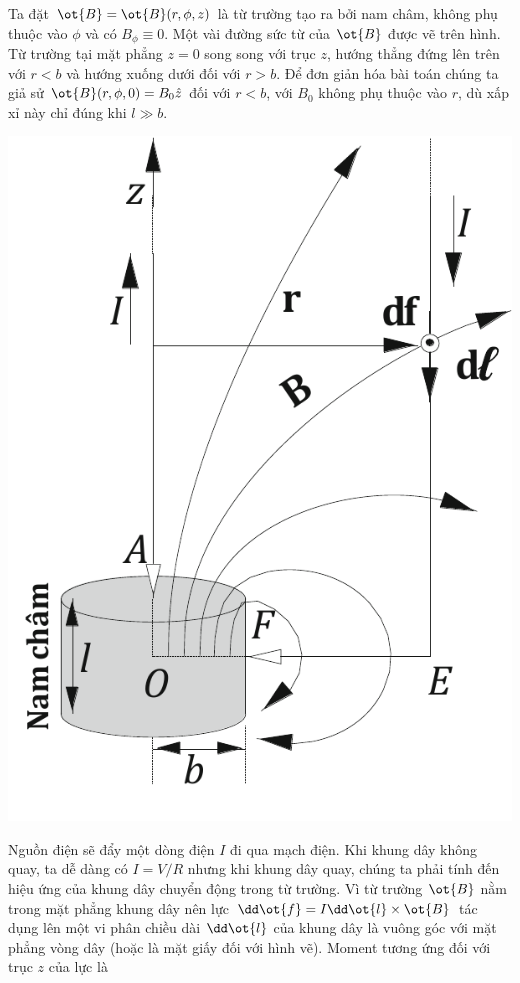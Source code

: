 \begin{loigiai}
\begin{center}
 \end{center}
Ta đặt $\ot{B} = \ot{B} (r, \phi, z)$ là từ trường tạo ra bởi nam châm, không phụ thuộc vào $\phi$ và có $B_{\phi} \equiv 0$. Một vài đường sức từ của $\ot{B}$ được vẽ trên hình. Từ trường tại mặt phẳng $z=0$ song song với trục $z$, hướng thẳng đứng lên trên với $r<b$ và hướng xuống dưới đối với $r>b$. Để đơn giản hóa bài toán chúng ta giả sử $\ot{B} (r,\phi, 0) = B_0 \hat{{z}} $ đối với $r<b$, với $B_0$ không phụ thuộc vào $r$, dù xấp xỉ này chỉ đúng khi $l \gg b$.
 \begin{center}
     \includegraphics[scale=0.6]{Anh/Nam_P4.pdf}
 \end{center}
Nguồn điện sẽ đẩy một dòng điện $I$ đi qua mạch điện. Khi khung dây không quay, ta dễ dàng có $I= V/R$ nhưng khi khung dây quay, chúng ta phải tính đến hiệu ứng của khung dây chuyển động trong từ trường. Vì từ trường $\ot{B}$ nằm trong mặt phẳng khung dây nên lực $\dd\ot{f} = I \dd\ot{l}\times \ot{B}$ tác dụng lên một vi phân chiều dài $\dd\ot{l}$ của khung dây là vuông góc với mặt phẳng vòng dây (hoặc là mặt giấy đối với hình vẽ). Moment tương ứng đối với trục $z$ của lực là 

\end{loigiai}
